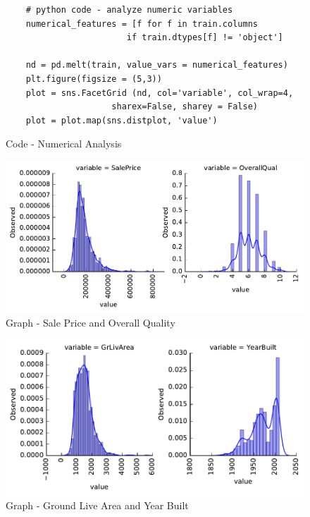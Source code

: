 \documentclass[sigconf]{acmart}
\begin{document}
	\begin{figure}[htb]
	\begin{verbatim}
	# python code - analyze numeric variables
	numerical_features = [f for f in train.columns 
						if train.dtypes[f] != 'object']
	
	nd = pd.melt(train, value_vars = numerical_features)	
	plt.figure(figsize = (5,3))
	plot = sns.FacetGrid (nd, col='variable', col_wrap=4,
	                 sharex=False, sharey = False)
	plot = plot.map(sns.distplot, 'value')				
	\end{verbatim}
	\caption{Code - Numerical Analysis}\label{c:analyze-numeric}
	\end{figure}

	
	\begin{figure}[htb]
		\centering
		\includegraphics[width=1.0\columnwidth]{images/num_features_1}	
		\caption{Graph - Sale Price and Overall Quality}\label{fig:num-feature-1}		
	\end{figure}

	\begin{figure}[htb]
		\centering
		\includegraphics[width=1.0\columnwidth]{images/num_features_2}	
		\caption{Graph - Ground Live Area and Year Built} \label{fig:num_features_2} 
	\end{figure}
\end{document}
